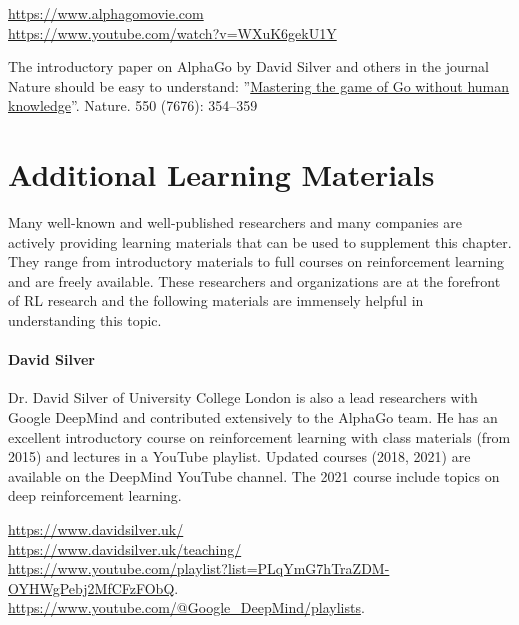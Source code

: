 \begin{resourcebox}
\small
\url{https://www.alphagomovie.com} \\

\url{https://www.youtube.com/watch?v=WXuK6gekU1Y}
\normalsize
\end{resourcebox}

The introductory paper on AlphaGo by David Silver and others in the journal Nature should be easy to understand: ''\href{https://www.nature.com/articles/nature24270}{Mastering the game of Go without human knowledge}''. Nature. 550 (7676): 354--359

\section{Additional Learning Materials}

Many well-known and well-published researchers and many companies are actively providing learning materials that can be used to supplement this chapter. They range from introductory materials to full courses on reinforcement learning and are freely available. These researchers and organizations are at the forefront of RL research and the following materials are immensely helpful in understanding this topic.

\paragraph*{David Silver}
Dr. David Silver of University College London is also a lead researchers with Google DeepMind and contributed extensively to the AlphaGo team. He has an excellent introductory course on reinforcement learning with class materials (from 2015) and lectures in a YouTube playlist. Updated courses (2018, 2021) are available on the DeepMind YouTube channel. The 2021 course include topics on deep reinforcement learning. \\

\begin{resourcebox}
\footnotesize
\url{https://www.davidsilver.uk/} \\

\url{https://www.davidsilver.uk/teaching/} \\

\url{https://www.youtube.com/playlist?list=PLqYmG7hTraZDM-OYHWgPebj2MfCFzFObQ}. \\

\url{https://www.youtube.com/@Google_DeepMind/playlists}.
\end{resourcebox}

